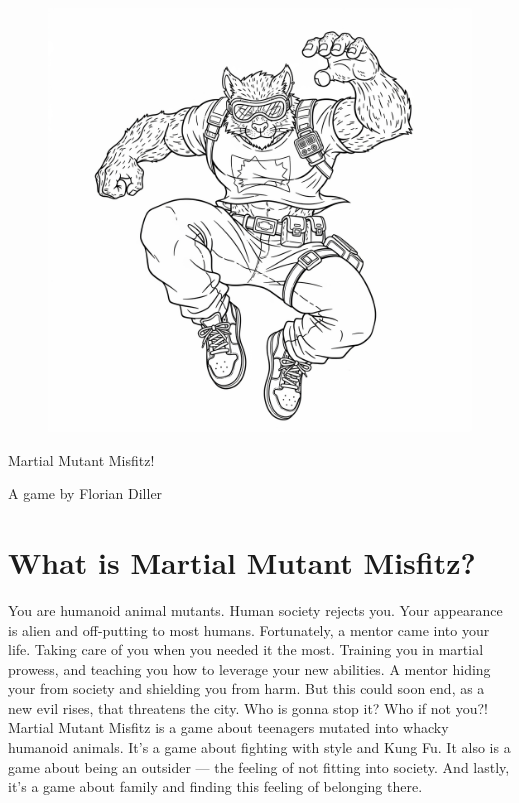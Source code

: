 \documentclass{book}
\begin{document}

\vspace*{\fill}

\begin{figure}[tph!]
\centering\includegraphics[width=12cm]{images/frontCover.png}
\end{figure}
\centering\Huge{}Martial Mutant Misfitz!
\normalfont\large

A game by Florian Diller

\newpage

\raggedright
\chapter*{What is Martial Mutant Misfitz?}
\normalfont\large You are humanoid animal mutants. Human society rejects you. Your appearance is alien and off-putting to most humans. Fortunately, a mentor came into your life. Taking care of you when you needed it the most. Training you in martial prowess, and teaching you how to leverage your new abilities. A mentor hiding your from society and shielding you from harm. But this could soon end, as a new evil rises, that threatens the city. Who is gonna stop it? Who if not you?!\\
\medskip
Martial Mutant Misfitz is a game about teenagers mutated into whacky humanoid animals. It's a game about fighting with style and Kung Fu. It also is a game about being an outsider --- the feeling of not fitting into society. And lastly, it's a game about family and finding this feeling of belonging there.
\end{document}
